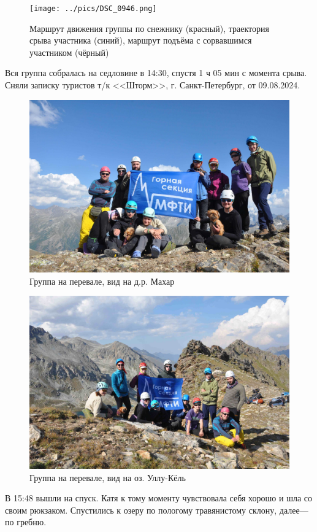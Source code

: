 \begin{figure}[h!]
	\centering
	\texttt{[image: ../pics/DSC\_0946.png]}
	\caption{Маршрут движения группы по снежнику (красный), траектория срыва участника (синий), маршрут подъёма с сорвавшимся участником (чёрный)}
	\label{fig:DSC_0946}
\end{figure}


Вся группа собралась на седловине в 14:30, спустя 1 ч 05 мин с момента срыва. Сняли записку туристов т/к <<Шторм>>, г. Санкт-Петербург, от 09.08.2024.


\begin{figure}[h!]
	\centering
	\includegraphics[width=0.7\linewidth]{../pics/DSC_0982}
	\caption{Группа на перевале, вид на д.р. Махар}
	\label{fig:DSC_0982}
\end{figure}

\begin{figure}[h!]
	\centering
	\includegraphics[width=0.7\linewidth]{../pics/DSC_0986}
	\caption{Группа на перевале, вид на оз. Уллу-Кёль}
	\label{fig:DSC_0986}
\end{figure}


В 15:48 вышли на спуск. Катя к тому моменту чувствовала себя хорошо и шла со своим рюкзаком.
Спустились к озеру по пологому травянистому склону, далее--- по гребню.

